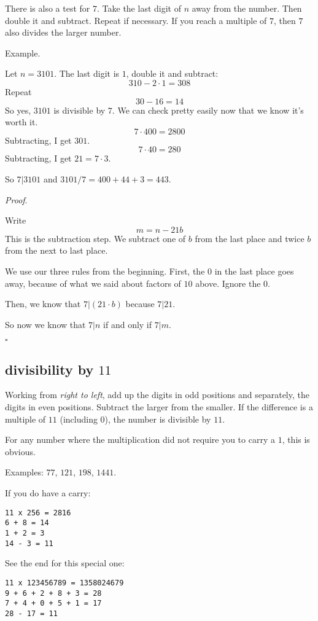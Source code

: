 \documentclass[11pt, oneside]{article}
\begin{document}
There is also a test for $7$.  Take the last digit of $n$ away from the number.  Then double it and subtract.  Repeat if necessary.  If you reach a multiple of $7$, then $7$ also divides the larger number.

Example.

Let $n = 3101$.  The last digit is $1$, double it and subtract:
\[ 310 - 2 \cdot 1 = 308 \]
Repeat
\[ 30 - 16 = 14 \]
So yes, $3101$ is divisible by $7$.  We can check pretty easily now that we know it's worth it.
\[ 7 \cdot 400 = 2800 \]
Subtracting, I get $301$.
\[ 7 \cdot 40 = 280 \]
Subtracting, I get $21 = 7 \cdot 3$.  

So $7|3101$ and $3101/7 = 400 + 44 + 3 = 443$.

\emph{Proof}.

Write
\[ m = n - 21b \]
This is the subtraction step.  We subtract one of $b$ from the last place and twice $b$ from the next to last place.  

We use our three rules from the beginning.  First, the $0$ in the last place goes away, because of what we said about factors of $10$ above.  Ignore the $0$.

Then, we know that $7|(21 \cdot b)$ because $7|21$.  

So now we know that $7|n$ if and only if $7|m$.

$\square$

\subsection*{divisibility by $11$}

Working from \emph{right to left}, add up the digits in odd positions and separately, the digits in even positions.  Subtract the larger from the smaller.  If the difference is a multiple of $11$ (including $0$), the number is divisible by $11$.

For any number where the multiplication did not require you to carry a $1$, this is obvious.

Examples:  $77$, $121$, $198$, $1441$.

If you do have a carry:

\begin{verbatim}
11 x 256 = 2816
6 + 8 = 14
1 + 2 = 3
14 - 3 = 11
\end{verbatim}

See the end for this special one:

\begin{verbatim}
11 x 123456789 = 1358024679
9 + 6 + 2 + 8 + 3 = 28
7 + 4 + 0 + 5 + 1 = 17
28 - 17 = 11
\end{verbatim}
\end{document}
